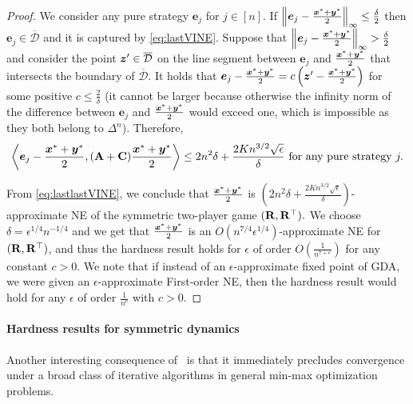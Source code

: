 \begin{proof}
\noindent We consider any pure strategy $\bm{e}_j$ for $j\in[n]$. If $\left\|\bm{e}_j - \frac{{\bm{x}}^*+{\bm{y}}^*}{2}\right\|_{\infty} \leq \frac{\delta}{2}$ then $\bm{e}_j \in \overline{\mathcal{D}}$ 
and it is captured by \eqref{eq:lastVINE}. Suppose that 
$\left\|\bm{e}_j - \frac{{\bm{x}}^*+{\bm{y}}^*}{2}\right\|_{\infty} > \frac{\delta}{2}$
and consider the point ${\bm{z}}' \in \overline{\mathcal{D}}$ on the line segment between $\bm{e}_j$ and $\frac{{\bm{x}}^*+{\bm{y}}^*}{2}$ that intersects the boundary of $\overline{\mathcal{D}}.$ It holds that $\bm{e}_j - \frac{{\bm{x}}^*+{\bm{y}}^*}{2} = c\left({\bm{z}}' - \frac{{\bm{x}}^*+{\bm{y}}^*}{2} \right)$ for some positive $c \leq \frac{2}{\delta}$ (it cannot be larger because otherwise the infinity norm of the difference between $\bm{e}_j$ and $\frac{{\bm{x}}^*+{\bm{y}}^*}{2}$ would exceed one, which is impossible as they both belong to $\Delta^n$). Therefore, 
\begin{equation}
\label{eq:lastlastVINE}
\left\langle \bm{e}_j - \frac{{\bm{x}}^*+{\bm{y}}^*}{2}, (\mathbf{A}+\mathbf{C})\frac{{\bm{x}}^*+{\bm{y}}^*}{2} \right\rangle \leq 2n^2 \delta + \frac{2Kn^{3/2}\sqrt{\epsilon}}{\delta} \textrm{ for any pure strategy }j. 
\end{equation}

From \eqref{eq:lastlastVINE}, we conclude that $\frac{{\bm{x}}^*+{\bm{y}}^*}{2}$ is $\left(2n^{2}\delta + \frac{2Kn^{3/2}\sqrt{\epsilon}}{\delta}\right)$-approximate NE of the symmetric two-player game $(\mathbf{R},\mathbf{R}^{\top}).$ We choose $\delta = \epsilon^{1/4} n^{-1/4}$ and we get that $\frac{{\bm{x}}^*+{\bm{y}}^*}{2}$ is an $O(n^{7/4}\epsilon^{1/4})$-approximate NE for $(\mathbf{R},\mathbf{R}^{\top})$, and thus the hardness result holds for $\epsilon$ of order  $O\left(\frac{1}{n^{7+c}}\right)$ for any constant $c>0.$ We note that if instead of an $\epsilon$-approximate fixed point of GDA, we were given an $\epsilon$-approximate First-order NE, then the hardness result would hold for any $\epsilon$ of order $\frac{1}{n^{c}}$ with $c>0.$
\end{proof}

\paragraph{Hardness results for symmetric dynamics}

Another interesting consequence of~ is that it immediately precludes convergence under a broad class of iterative algorithms in general min-max optimization problems. 

